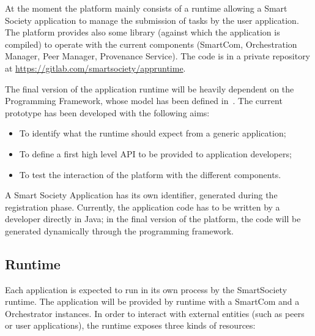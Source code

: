 At the moment the platform mainly consists of a runtime allowing a Smart Society application to manage the submission of tasks by the user application. The platform provides also some library (against which the application is compiled) to operate with the current components (SmartCom, Orchestration Manager, Peer Manager, Provenance Service). The code is in a private repository at \url{https://gitlab.com/smartsociety/appruntime}.

The final version of the application runtime will be heavily dependent on the Programming Framework, whose model has been defined in~\cite{D7.2}. The current prototype has been developed with the following aims: 
\begin{itemize}
	\item To identify what the runtime should expect from a generic application;
    \item To define a first high level API to be provided to application developers;
	\item To test the interaction of the platform with the different components.
\end{itemize}

A Smart Society Application has its own identifier, generated during the registration phase. Currently, the application code has to be written by a developer directly in Java; in the final version of the platform, the code will be generated dynamically through the programming framework. %

\subsection{Runtime}
Each application is expected to run in its own process by the SmartSociety runtime. The application will be provided by runtime with a SmartCom and a Orchestrator instances. In order to interact with external entities (such as peers or user applications), the runtime exposes three kinds of resources:

